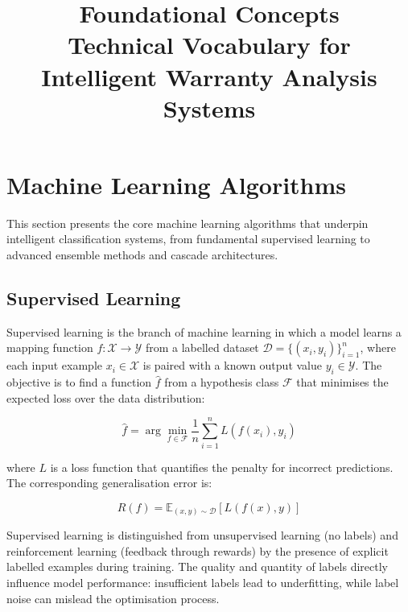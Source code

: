 \documentclass[10pt,a4paper]{article}
\title{\textbf{Foundational Concepts}\\[0.3em]
\large Technical Vocabulary for Intelligent Warranty Analysis Systems}
\author{}
\date{}
\begin{document}
\maketitle
\tableofcontents
\newpage


\section{Machine Learning Algorithms}
\label{sec:ml-algorithms}

This section presents the core machine learning algorithms that underpin intelligent classification systems, from fundamental supervised learning to advanced ensemble methods and cascade architectures.

\subsection{Supervised Learning}
\label{sec:supervised-learning}

Supervised learning is the branch of machine learning in which a model learns a mapping function $f: \mathcal{X} \to \mathcal{Y}$ from a labelled dataset $\mathcal{D} = \{(x_i, y_i)\}_{i=1}^{n}$, where each input example $x_i \in \mathcal{X}$ is paired with a known output value $y_i \in \mathcal{Y}$. The objective is to find a function $\hat{f}$ from a hypothesis class $\mathcal{F}$ that minimises the expected loss over the data distribution:

\begin{equation}
\hat{f} = \arg\min_{f \in \mathcal{F}} \frac{1}{n} \sum_{i=1}^{n} L(f(x_i), y_i)
\label{eq:erm}
\end{equation}

where $L$ is a loss function that quantifies the penalty for incorrect predictions. The corresponding generalisation error is:

\begin{equation}
R(f) = \mathbb{E}_{(x,y) \sim \mathcal{D}}[L(f(x), y)]
\label{eq:gen-error}
\end{equation}

Supervised learning is distinguished from unsupervised learning (no labels) and reinforcement learning (feedback through rewards) by the presence of explicit labelled examples during training. The quality and quantity of labels directly influence model performance: insufficient labels lead to underfitting, while label noise can mislead the optimisation process.
\end{document}
